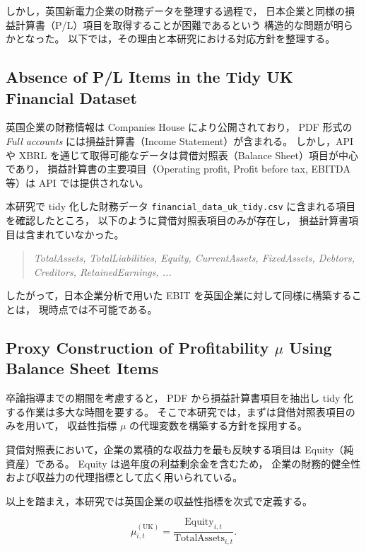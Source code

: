 しかし，英国新電力企業の財務データを整理する過程で，
日本企業と同様の損益計算書（P/L）項目を取得することが困難であるという
構造的な問題が明らかとなった。
以下では，その理由と本研究における対応方針を整理する。

\subsection*{Absence of P/L Items in the Tidy UK Financial Dataset}

英国企業の財務情報は Companies House により公開されており，
PDF 形式の \textit{Full accounts} には損益計算書（Income Statement）が含まれる。
しかし，API や XBRL を通じて取得可能なデータは貸借対照表（Balance Sheet）項目が中心であり，
損益計算書の主要項目（Operating profit, Profit before tax, EBITDA 等）は
API では提供されない。

本研究で tidy 化した財務データ \texttt{financial\_data\_uk\_tidy.csv} に含まれる項目を確認したところ，
以下のように貸借対照表項目のみが存在し，
損益計算書項目は含まれていなかった。

\begin{quote}
\textit{TotalAssets, TotalLiabilities, Equity, CurrentAssets, FixedAssets, Debtors, Creditors, RetainedEarnings, ...}
\end{quote}

したがって，日本企業分析で用いた EBIT を英国企業に対して同様に構築することは，
現時点では不可能である。

\subsection*{Proxy Construction of Profitability $\mu$ Using Balance Sheet Items}

卒論指導までの期間を考慮すると，
PDF から損益計算書項目を抽出し tidy 化する作業は多大な時間を要する。
そこで本研究では，まずは貸借対照表項目のみを用いて，
収益性指標 $\mu$ の代理変数を構築する方針を採用する。

貸借対照表において，企業の累積的な収益力を最も反映する項目は Equity（純資産）である。
Equity は過年度の利益剰余金を含むため，
企業の財務的健全性および収益力の代理指標として広く用いられている。

以上を踏まえ，本研究では英国企業の収益性指標を次式で定義する。



\[
\mu_{i,t}^{(\text{UK})}
= \frac{\text{Equity}_{i,t}}{\text{TotalAssets}_{i,t}}.
\]



